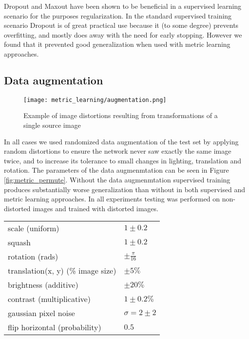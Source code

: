 Dropout and Maxout have been shown to be beneficial in a supervised learning scenario for the purposes regularization. In the standard supervised training scenario Dropout is of great practical use because it (to some degree) prevents overfitting, and mostly does away with the need for early stopping. However we found that it prevented good generalization when used with metric learning approaches.

\subsection {Data augmentation}

\begin{figure}[h]
\centering
\texttt{[image: metric\_learning/augmentation.png]}
\caption{Example of image distortions resulting from transformations of a single source image}
\label{fig:metric_augmentation}
\end{figure}


In all cases we used randomized data augmentation of the test set by applying random distortions to ensure the network never saw exactly the same image twice, and to increase its tolerance to small changes in lighting, translation and rotation. The parameters of the data augmenmtation can be seen in Figure \ref{fig:metric_permute}. Without the data augmenmtation supervised training produces substantially worse generalization than without in both supervised and metric learning approaches. In all experiments testing was performed on non-distorted images and trained with distorted images.

\begin{table*}
  \centering
    \caption{Ranges of parameters used for image distortion }

  \begin{tabular}{ l  l }
    \toprule
    scale (uniform) & $ 1 \pm 0.2 $  \\ 
    squash  & $ 1 \pm 0.2 $  \\ 
    rotation (rads) & $ \pm \frac{\pi}{16} $ \\ 
    translation(x, y) (\% image size) & $ \pm 5 \% $ \\ 
    brightness (additive) & $ \pm 20 \% $ \\ 
    contrast (multiplicative) & $ 1 \pm 0.2 \% $ \\ 
    gaussian pixel noise & $ \sigma = 2 \pm 2 $  \\ 
    flip horizontal (probability) & $ 0.5 $ \\ 
    \bottomrule
  \end{tabular}
\label{fig:metric_permute}
\end{table*}

